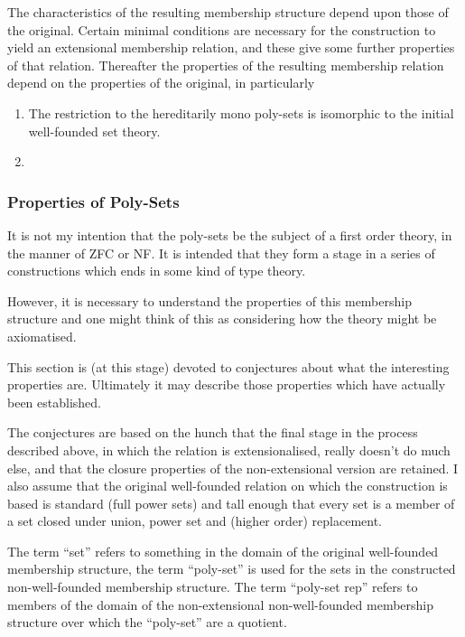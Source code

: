 \documentclass[numreferences]{rbjk}
\begin{document}
\begin{article}
The characteristics of the resulting membership structure depend upon those of the original.
Certain minimal conditions are necessary for the construction to yield an extensional membership relation, and these give some further properties of that relation.
Thereafter the properties of the resulting membership relation depend on the properties of the original, in particularly 

\begin{enumerate}
\item The restriction to the hereditarily mono poly-sets is isomorphic to the initial well-founded set theory.
\item 
\end{enumerate}

\subsubsection{Properties of Poly-Sets}

It is not my intention that the poly-sets be the subject of a first order theory, in the manner of ZFC or NF.
It is intended that they form a stage in a series of constructions which ends in some kind of type theory.

However, it is necessary to understand the properties of this membership structure and one might think of this as considering how the theory might be axiomatised.

This section is (at this stage) devoted to conjectures about what the interesting properties are.
Ultimately it may describe those properties which have actually been established.

The conjectures are based on the hunch that the final stage in the process described above, in which the relation is extensionalised, really doesn't do much else, and that the closure properties of the non-extensional version are retained.
I also assume that the original well-founded relation on which the construction is based is standard (full power sets) and tall enough that every set is a member of a set closed under union, power set and (higher order) replacement.

The term ``set'' refers to something in the domain of the original well-founded membership structure, the term ``poly-set'' is used for the sets in the constructed non-well-founded membership structure.
The term ``poly-set rep'' refers to members of the domain of the non-extensional non-well-founded membership structure over which the ``poly-set'' are a quotient. 


\end{article}
\end{document}
